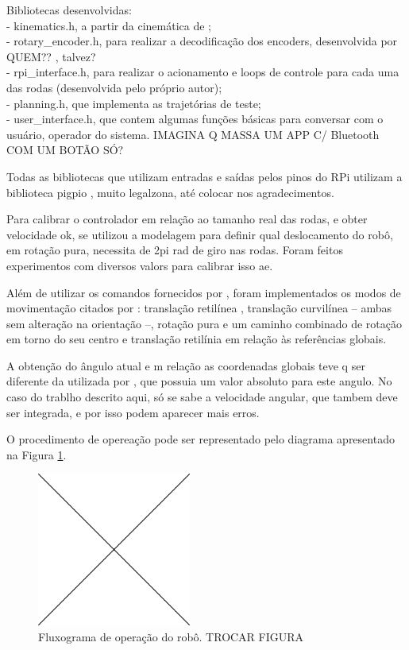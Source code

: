 Bibliotecas desenvolvidas: \\
- kinematics.h, a partir da cinemática de \cite{ritter2016modelagem}; \\
- rotary\_encoder.h, para realizar a decodificação dos encoders, desenvolvida por QUEM?? \cite{pigpio}, talvez?\\
- rpi\_interface.h, para realizar o acionamento e loops de controle para cada uma das rodas (desenvolvida pelo próprio autor);\\
- planning.h, que implementa as trajetórias de teste; \\
- user\_interface.h, que contem algumas funções básicas para conversar com o usuário, operador do sistema. IMAGINA Q MASSA UM APP C/ Bluetooth COM UM BOTÃO SÓ?

Todas as bibliotecas que utilizam entradas e saídas pelos pinos do RPi utilizam a biblioteca pigpio \citet{pigpio}, muito legalzona, até colocar nos agradecimentos.

Para calibrar o controlador em relação ao tamanho real das rodas, e obter velocidade ok, se utilizou a modelagem para definir qual deslocamento do robô, em rotação pura, necessita de 2pi rad de giro nas rodas. Foram feitos experimentos com diversos valors para calibrar isso ae.

Além de utilizar os comandos fornecidos por \citet{ritter2016modelagem}, foram implementados os modos de movimentação citados por \citet{loh2003mechatronics}: translação retilínea , translação curvilínea -- ambas sem alteração na orientação --, rotação pura e um caminho combinado de rotação em torno do seu centro e translação retilínia em relação às referências globais.

A obtenção do ângulo atual e m relação as coordenadas globais teve q ser diferente da utilizada por \citet{ritter2016modelagem}, que possuia um valor absoluto para este angulo. No caso do trablho descrito aqui, só se sabe a velocidade angular, que tambem deve ser integrada, e por isso podem aparecer mais erros.

O procedimento de opereação pode ser representado pelo diagrama apresentado na Figura \ref{fig:operation}.


\begin{figure}[h]
  \centering
  \includegraphics[width = 0.45\textwidth]{imagens/edc}
  \caption{Fluxograma de operação do robô. TROCAR FIGURA}
  \label{fig:operation}
\end{figure}

